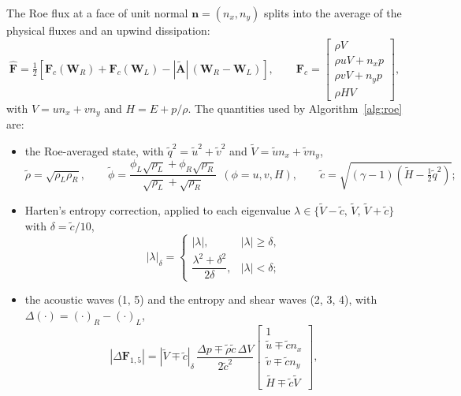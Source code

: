 \documentclass[12pt,a4paper]{article}
\begin{document}
The Roe flux at a face of unit normal $\mathbf{n}=(n_x,n_y)$ splits into the
average of the physical fluxes and an upwind dissipation:
\begin{equation}
  \widehat{\mathbf{F}}=\tfrac12\left[\mathbf{F}_c(\mathbf{W}_R)+\mathbf{F}_c(\mathbf{W}_L)
  -|\tilde{\mathbf{A}}|\,(\mathbf{W}_R-\mathbf{W}_L)\right],
  \qquad
  \mathbf{F}_c=\begin{bmatrix}\rho V\\ \rho uV+n_xp\\ \rho vV+n_yp\\ \rho HV\end{bmatrix},
  \label{eq:roe}
\end{equation}
with $V=un_x+vn_y$ and $H=E+p/\rho$. The quantities used by Algorithm~\ref{alg:roe} are:
\begin{itemize}
  \item the Roe-averaged state, with $\tilde q^2=\tilde u^2+\tilde v^2$ and $\tilde V=\tilde un_x+\tilde vn_y$,
  \begin{equation}
    \tilde\rho=\sqrt{\rho_L\rho_R},\qquad
    \tilde\phi=\frac{\phi_L\sqrt{\rho_L}+\phi_R\sqrt{\rho_R}}{\sqrt{\rho_L}+\sqrt{\rho_R}}\ \ (\phi=u,v,H),\qquad
    \tilde c=\sqrt{(\gamma-1)\left(\tilde H-\tfrac12\tilde q^2\right)};
    \label{eq:roeavg}
  \end{equation}
  \item Harten's entropy correction, applied to each eigenvalue
  $\lambda\in\{\tilde V-\tilde c,\,\tilde V,\,\tilde V+\tilde c\}$ with $\delta=\tilde c/10$,
  \begin{equation}
    |\lambda|_\delta=
    \begin{cases}
      |\lambda|, & |\lambda|\ge\delta,\\[2pt]
      \dfrac{\lambda^2+\delta^2}{2\delta}, & |\lambda|<\delta;
    \end{cases}
    \label{eq:harten}
  \end{equation}
  \item the acoustic waves (1, 5) and the entropy and shear waves (2, 3, 4), with
  $\Delta(\cdot)=(\cdot)_R-(\cdot)_L$,
  \begin{equation}
    |\Delta\mathbf{F}_{1,5}|=|\tilde V\mp\tilde c|_\delta\,\frac{\Delta p\mp\tilde\rho\tilde c\,\Delta V}{2\tilde c^2}
    \begin{bmatrix}1\\ \tilde u\mp\tilde c n_x\\ \tilde v\mp\tilde c n_y\\ \tilde H\mp\tilde c\tilde V\end{bmatrix},

\end{equation}
\end{itemize}
\end{document}
